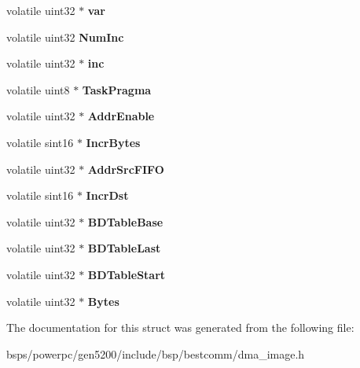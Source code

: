 \begin{DoxyCompactItemize}
\item 
\mbox{\label{structtask__info13_a2e996040755771a7e0e9c418df05daf1}} 
volatile uint32 $\ast$ {\bfseries var}
\item 
\mbox{\label{structtask__info13_a931e90b048a0c745592379032d37bdbc}} 
volatile uint32 {\bfseries Num\+Inc}
\item 
\mbox{\label{structtask__info13_ac96ee4606526353c7582bda6ebbc1a5b}} 
volatile uint32 $\ast$ {\bfseries inc}
\item 
\mbox{\label{structtask__info13_a291008e2158862b6eebcddaaf434e201}} 
volatile uint8 $\ast$ {\bfseries Task\+Pragma}
\item 
\mbox{\label{structtask__info13_a947b963320f2a49dde447887137c6833}} 
volatile uint32 $\ast$ {\bfseries Addr\+Enable}
\item 
\mbox{\label{structtask__info13_a9eb4fa44a7cf6116851a5e8d77352ab1}} 
volatile sint16 $\ast$ {\bfseries Incr\+Bytes}
\item 
\mbox{\label{structtask__info13_a0855b1e02c89a682877b84a75824fb16}} 
volatile uint32 $\ast$ {\bfseries Addr\+Src\+F\+I\+FO}
\item 
\mbox{\label{structtask__info13_a01ccda26079d46c0f5e72adaa29d117d}} 
volatile sint16 $\ast$ {\bfseries Incr\+Dst}
\item 
\mbox{\label{structtask__info13_aec61d2b39ae05b80c8e24d16fe148631}} 
volatile uint32 $\ast$ {\bfseries B\+D\+Table\+Base}
\item 
\mbox{\label{structtask__info13_aab316dd24365755376bb5d1c4d0f0245}} 
volatile uint32 $\ast$ {\bfseries B\+D\+Table\+Last}
\item 
\mbox{\label{structtask__info13_a965c8efd54c2c02f0021e2acb3bc8a94}} 
volatile uint32 $\ast$ {\bfseries B\+D\+Table\+Start}
\item 
\mbox{\label{structtask__info13_ad6c62a292b7561dd6b8157e4b1acc4f7}} 
volatile uint32 $\ast$ {\bfseries Bytes}
\end{DoxyCompactItemize}


The documentation for this struct was generated from the following file\+:\begin{DoxyCompactItemize}
\item 
bsps/powerpc/gen5200/include/bsp/bestcomm/dma\+\_\+image.\+h\end{DoxyCompactItemize}
